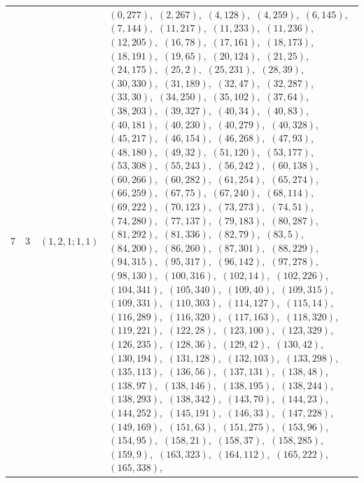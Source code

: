 \documentclass[11pt]{article}
\begin{document}
\begin{longtable}{@{}rrl>{\raggedright\arraybackslash}p{}@{}}
7 & 3 & $(1,2,1;1,1)$ & $(0,277)$,\allowbreak\ $(2,267)$,\allowbreak\ $(4,128)$,\allowbreak\ $(4,259)$,\allowbreak\ $(6,145)$,\allowbreak\ $(7,144)$,\allowbreak\ $(11,217)$,\allowbreak\ $(11,233)$,\allowbreak\ $(11,236)$,\allowbreak\ $(12,205)$,\allowbreak\ $(16,78)$,\allowbreak\ $(17,161)$,\allowbreak\ $(18,173)$,\allowbreak\ $(18,191)$,\allowbreak\ $(19,65)$,\allowbreak\ $(20,124)$,\allowbreak\ $(21,25)$,\allowbreak\ $(24,175)$,\allowbreak\ $(25,2)$,\allowbreak\ $(25,231)$,\allowbreak\ $(28,39)$,\allowbreak\ $(30,330)$,\allowbreak\ $(31,189)$,\allowbreak\ $(32,47)$,\allowbreak\ $(32,287)$,\allowbreak\ $(33,30)$,\allowbreak\ $(34,250)$,\allowbreak\ $(35,102)$,\allowbreak\ $(37,64)$,\allowbreak\ $(38,203)$,\allowbreak\ $(39,327)$,\allowbreak\ $(40,34)$,\allowbreak\ $(40,83)$,\allowbreak\ $(40,181)$,\allowbreak\ $(40,230)$,\allowbreak\ $(40,279)$,\allowbreak\ $(40,328)$,\allowbreak\ $(45,217)$,\allowbreak\ $(46,154)$,\allowbreak\ $(46,268)$,\allowbreak\ $(47,93)$,\allowbreak\ $(48,180)$,\allowbreak\ $(49,32)$,\allowbreak\ $(51,120)$,\allowbreak\ $(53,177)$,\allowbreak\ $(53,308)$,\allowbreak\ $(55,243)$,\allowbreak\ $(56,242)$,\allowbreak\ $(60,138)$,\allowbreak\ $(60,266)$,\allowbreak\ $(60,282)$,\allowbreak\ $(61,254)$,\allowbreak\ $(65,274)$,\allowbreak\ $(66,259)$,\allowbreak\ $(67,75)$,\allowbreak\ $(67,240)$,\allowbreak\ $(68,114)$,\allowbreak\ $(69,222)$,\allowbreak\ $(70,123)$,\allowbreak\ $(73,273)$,\allowbreak\ $(74,51)$,\allowbreak\ $(74,280)$,\allowbreak\ $(77,137)$,\allowbreak\ $(79,183)$,\allowbreak\ $(80,287)$,\allowbreak\ $(81,292)$,\allowbreak\ $(81,336)$,\allowbreak\ $(82,79)$,\allowbreak\ $(83,5)$,\allowbreak\ $(84,200)$,\allowbreak\ $(86,260)$,\allowbreak\ $(87,301)$,\allowbreak\ $(88,229)$,\allowbreak\ $(94,315)$,\allowbreak\ $(95,317)$,\allowbreak\ $(96,142)$,\allowbreak\ $(97,278)$,\allowbreak\ $(98,130)$,\allowbreak\ $(100,316)$,\allowbreak\ $(102,14)$,\allowbreak\ $(102,226)$,\allowbreak\ $(104,341)$,\allowbreak\ $(105,340)$,\allowbreak\ $(109,40)$,\allowbreak\ $(109,315)$,\allowbreak\ $(109,331)$,\allowbreak\ $(110,303)$,\allowbreak\ $(114,127)$,\allowbreak\ $(115,14)$,\allowbreak\ $(116,289)$,\allowbreak\ $(116,320)$,\allowbreak\ $(117,163)$,\allowbreak\ $(118,320)$,\allowbreak\ $(119,221)$,\allowbreak\ $(122,28)$,\allowbreak\ $(123,100)$,\allowbreak\ $(123,329)$,\allowbreak\ $(126,235)$,\allowbreak\ $(128,36)$,\allowbreak\ $(129,42)$,\allowbreak\ $(130,42)$,\allowbreak\ $(130,194)$,\allowbreak\ $(131,128)$,\allowbreak\ $(132,103)$,\allowbreak\ $(133,298)$,\allowbreak\ $(135,113)$,\allowbreak\ $(136,56)$,\allowbreak\ $(137,131)$,\allowbreak\ $(138,48)$,\allowbreak\ $(138,97)$,\allowbreak\ $(138,146)$,\allowbreak\ $(138,195)$,\allowbreak\ $(138,244)$,\allowbreak\ $(138,293)$,\allowbreak\ $(138,342)$,\allowbreak\ $(143,70)$,\allowbreak\ $(144,23)$,\allowbreak\ $(144,252)$,\allowbreak\ $(145,191)$,\allowbreak\ $(146,33)$,\allowbreak\ $(147,228)$,\allowbreak\ $(149,169)$,\allowbreak\ $(151,63)$,\allowbreak\ $(151,275)$,\allowbreak\ $(153,96)$,\allowbreak\ $(154,95)$,\allowbreak\ $(158,21)$,\allowbreak\ $(158,37)$,\allowbreak\ $(158,285)$,\allowbreak\ $(159,9)$,\allowbreak\ $(163,323)$,\allowbreak\ $(164,112)$,\allowbreak\ $(165,222)$,\allowbreak\ $(165,338)$,\allowbreak\ 
\end{longtable}
\end{document}
